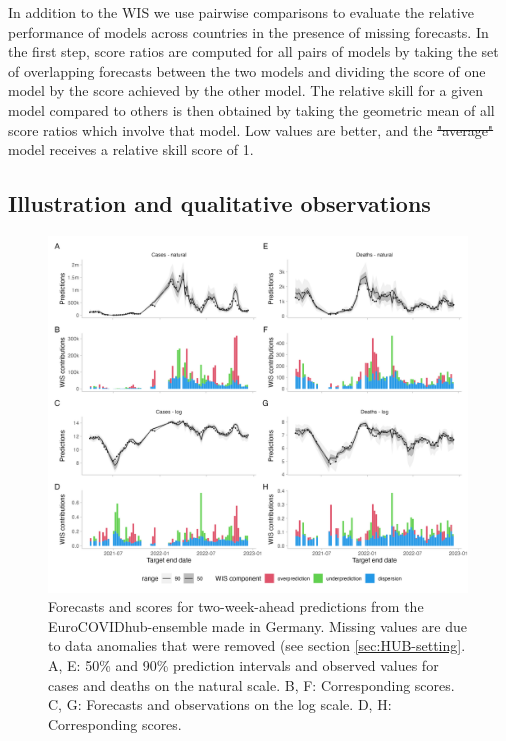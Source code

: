 \documentclass{article}
\providecommand{\DIFaddtex}[1]{{\protect\color{blue}\uwave{#1}}} %
\providecommand{\DIFdeltex}[1]{{\protect\color{red}\sout{#1}}}                      %
\providecommand{\DIFaddbegin}{} %
\providecommand{\DIFaddend}{} %
\providecommand{\DIFdelbegin}{} %
\providecommand{\DIFdelend}{} %
\providecommand{\DIFaddbeginFL}{} %
\providecommand{\DIFaddendFL}{} %
\providecommand{\DIFdelbeginFL}{} %
\providecommand{\DIFdelendFL}{} %
\providecommand{\DIFadd}[1]{\texorpdfstring{\DIFaddtex{#1}}{#1}} %
\providecommand{\DIFdel}[1]{\texorpdfstring{\DIFdeltex{#1}}{}} %
\newcommand{\DIFscaledelfig}{0.5}
\newlength{\DIFdelgraphicswidth} %
\newlength{\DIFdelgraphicsheight} %
\newcommand{\DIFaddincludegraphics}[2][]{{\color{blue}\fbox{\DIFOincludegraphics[#1]{#2}}}} %
\newcommand{\DIFdelincludegraphics}[2][]{%
\sbox{\DIFdelgraphicsbox}{\DIFOincludegraphics[#1]{#2}}%
\settoboxwidth{\DIFdelgraphicswidth}{\DIFdelgraphicsbox} %
\settoboxtotalheight{\DIFdelgraphicsheight}{\DIFdelgraphicsbox} %
\scalebox{\DIFscaledelfig}{%
\parbox[b]{\DIFdelgraphicswidth}{\usebox{\DIFdelgraphicsbox}\\[-\baselineskip] \rule{\DIFdelgraphicswidth}{0em}}\llap{\resizebox{\DIFdelgraphicswidth}{\DIFdelgraphicsheight}{%
\setlength{\unitlength}{\DIFdelgraphicswidth}%
\begin{picture}(1,1)%
\thicklines\linethickness{2pt} %
{\color[rgb]{1,0,0}\put(0,0){\framebox(1,1){}}}%
{\color[rgb]{1,0,0}\put(0,0){\line( 1,1){1}}}%
{\color[rgb]{1,0,0}\put(0,1){\line(1,-1){1}}}%
\end{picture}%
}\hspace*{3pt}}} %
} %
\DeclareRobustCommand{\DIFaddbegin}{\DIFOaddbegin \let\includegraphics\DIFaddincludegraphics} %
\DeclareRobustCommand{\DIFaddend}{\DIFOaddend \let\includegraphics\DIFOincludegraphics} %
\DeclareRobustCommand{\DIFdelbegin}{\DIFOdelbegin \let\includegraphics\DIFdelincludegraphics} %
\DeclareRobustCommand{\DIFdelend}{\DIFOaddend \let\includegraphics\DIFOincludegraphics} %
\DeclareRobustCommand{\DIFaddbeginFL}{\DIFOaddbeginFL \let\includegraphics\DIFaddincludegraphics} %
\DeclareRobustCommand{\DIFaddendFL}{\DIFOaddendFL \let\includegraphics\DIFOincludegraphics} %
\DeclareRobustCommand{\DIFdelbeginFL}{\DIFOdelbeginFL \let\includegraphics\DIFdelincludegraphics} %
\DeclareRobustCommand{\DIFdelendFL}{\DIFOaddendFL \let\includegraphics\DIFOincludegraphics} %
\begin{document}
In addition to the WIS we use pairwise comparisons \citep{cramerEvaluationIndividualEnsemble2021} to evaluate the relative performance of models across countries in the presence of missing forecasts. In the first step, score ratios are computed for all pairs of models by taking the set of overlapping forecasts between the two models and dividing the score of one model by the score achieved by the other model. The relative skill for a given model compared to others is then obtained by taking the geometric mean of all score ratios which involve that model. Low values are better, and the \DIFdelbegin \DIFdel{"average" }\DIFdelend \DIFaddbegin \DIFadd{``average'' }\DIFaddend model receives a relative skill score of 1. 


\subsection{Illustration and qualitative observations}

\begin{figure}[h!]
    \centering
    \DIFdelbeginFL %
\DIFdelendFL \DIFaddbeginFL \includegraphics[width=0.99\textwidth]{../output/figures/HUB-model-comparison-ensemble.png}
    \DIFaddendFL \caption{
    Forecasts and scores for two-week-ahead predictions from the EuroCOVIDhub-ensemble made in Germany. Missing values are due to data anomalies that were removed (see section \ref{sec:HUB-setting}. 
    A, E: 50\% and 90\% prediction intervals and observed values for cases and deaths on the natural scale. B, F: Corresponding scores. C, G: Forecasts and observations on the log scale. D, H: Corresponding scores. 
    }
    \label{fig:HUB-model-comparison-ensemble}
\end{figure}
\end{document}
